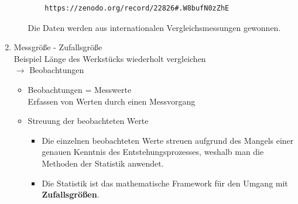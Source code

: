 \begin{raggedright}
\begin{enumerate}
\begin{itemize}
\begin{verbatim}
	https://zenodo.org/record/22826#.W8bufN0zZhE
	\end{verbatim}
			Die Daten werden aus internationalen Vergleichsmessungen gewonnen.
	\end{itemize}
\item Messgröße - Zufallsgröße\\
Beispiel Länge des Werkstücks wiederholt vergleichen\\
$\rightarrow$ Beobachtungen
\begin{itemize}
	\item Beobachtungen = Messwerte\\
		Erfassen von Werten durch einen Messvorgang
	\item Streuung der beobachteten Werte
		\begin{itemize}
		\item Die einzelnen beobachteten Werte streuen aufgrund des Mangels einer genauen
		Kenntnis des Entstehungsprozesses, weshalb man die Methoden der Statistik anwendet.
		\item Die Statistik ist das mathematische Framework für den Umgang mit \textbf{Zufallsgrößen}.
	\end{itemize}


\end{itemize}
\end{enumerate}
\end{raggedright}
